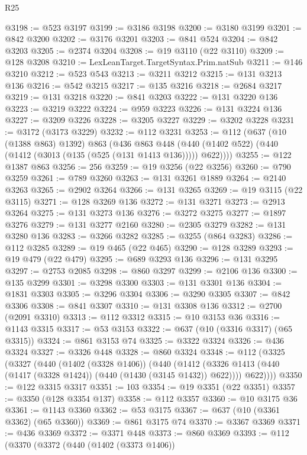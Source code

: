 \begin{lexlean}{R25}
\begin{coremodule}
@3198 := @523 @3197
@3199 := @3186 @3198
@3200 := @3180 @3199
@3201 := @842 @3200
@3202 := @3176 @3201
@3203 := @841 @524
@3204 := @842 @3203
@3205 := @2374 @3204
@3208 := @19 @3110 (@22 @3110)
@3209 := @128 @3208
@3210 := LexLeanTarget.TargetSyntax.Prim.natSub
@3211 := @146 @3210
@3212 := @523 @543
@3213 := @3211 @3212
@3215 := @131 @3213 @136
@3216 := @542 @3215
@3217 := @135 @3216
@3218 := @2684 @3217
@3219 := @131 @3218
@3220 := @841 @3203
@3222 := @131 @3220 @136
@3223 := @3219 @3222
@3224 := @959 @3223
@3226 := @131 @3224 @136
@3227 := @3209 @3226
@3228 := @3205 @3227
@3229 := @3202 @3228
@3231 := @3172 (@3173 @3229)
@3232 := @112 @3231
@3253 := @112
    (@637
      (@10 (@1388 @863) @1392)
      @863
      (@436
        @863
        @448
        (@440 (@1402 @522) (@440 (@1412 (@3013 (@135 (@525 (@131 @1413 @136))))) @622))))
@3255 := @122 @1387 @863
@3256 := 256
@3259 := @19 @3256 (@22 @3256)
@3260 := @790 @3259
@3261 := @789 @3260
@3263 := @131 @3261 @1889
@3264 := @2140 @3263
@3265 := @2902 @3264
@3266 := @131 @3265
@3269 := @19 @3115 (@22 @3115)
@3271 := @128 @3269 @136
@3272 := @131 @3271
@3273 := @2913 @3264
@3275 := @131 @3273 @136
@3276 := @3272 @3275
@3277 := @1897 @3276
@3279 := @131 @3277 @2160
@3280 := @2305 @3279
@3282 := @131 @3280 @136
@3283 := @3266 @3282
@3285 := @3255 (@864 @3283)
@3286 := @112 @3285
@3289 := @19 @465 (@22 @465)
@3290 := @128 @3289
@3293 := @19 @479 (@22 @479)
@3295 := @689 @3293 @136
@3296 := @131 @3295
@3297 := @2753 @2085
@3298 := @860 @3297
@3299 := @2106 @136
@3300 := @135 @3299
@3301 := @3298 @3300
@3303 := @131 @3301 @136
@3304 := @1831 @3303
@3305 := @3296 @3304
@3306 := @3290 @3305
@3307 := @842 @3306
@3308 := @841 @3307
@3310 := @131 @3308 @136
@3312 := @2700 (@2091 @3310)
@3313 := @112 @3312
@3315 := @10 @3153 @36
@3316 := @1143 @3315
@3317 := @53 @3153
@3322 := @637 (@10 (@3316 @3317) (@65 @3315))
@3324 := @861 @3153 @74
@3325 := @3322 @3324
@3326 := @436 @3324
@3327 := @3326 @448
@3328 := @860 @3324
@3348 := @112
    (@3325
      (@3327
        (@440
          (@1402 (@3328 @1406))
          (@440
            (@1412 (@3326 @1413 (@440 (@1417 (@3328 @1424)) (@440 (@1430 (@3145 @1432)) @622))))
            @622))))
@3350 := @122 @3315 @3317
@3351 := 103
@3354 := @19 @3351 (@22 @3351)
@3357 := @3350 (@128 @3354 @137)
@3358 := @112 @3357
@3360 := @10 @3175 @36
@3361 := @1143 @3360
@3362 := @53 @3175
@3367 := @637 (@10 (@3361 @3362) (@65 @3360))
@3369 := @861 @3175 @74
@3370 := @3367 @3369
@3371 := @436 @3369
@3372 := @3371 @448
@3373 := @860 @3369
@3393 := @112
    (@3370
      (@3372
        (@440
          (@1402 (@3373 @1406))

\end{coremodule}
\end{lexlean}
